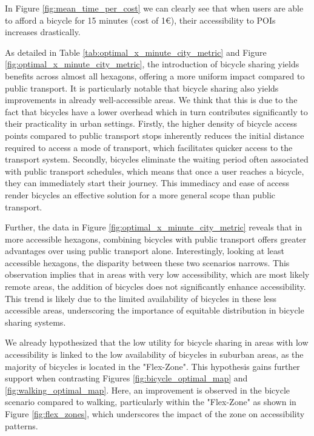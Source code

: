 In Figure \ref{fig:mean_time_per_cost} we can clearly see that when users are able to afford a bicycle for 15 minutes (cost of 1€), their accessibility to POIs increases drastically.


As detailed in Table \ref{tab:optimal_x_minute_city_metric} and Figure \ref{fig:optimal_x_minute_city_metric}, the introduction of bicycle sharing yields benefits across almost all hexagons, offering a more uniform impact compared to public transport. 
It is particularly notable that bicycle sharing also yields improvements in already well-accessible areas. 
We think that this is due to the fact that bicycles have a lower overhead which in turn contributes significantly to their practicality in urban settings.
Firstly, the higher density of bicycle access points compared to public transport stops inherently reduces the initial distance required to access a mode of transport, which  facilitates quicker access to the transport system. 
Secondly, bicycles eliminate the waiting period often associated with public transport schedules, which means that once a user reaches a bicycle, they can immediately start their journey. 
This immediacy and ease of access render bicycles an effective solution for a more general scope than public transport.

Further, the data in Figure \ref{fig:optimal_x_minute_city_metric} reveals that in more accessible hexagons, combining bicycles with public transport offers greater advantages over using public transport alone. 
Interestingly, looking at least accessible hexagons, the disparity between these two scenarios narrows. 
This observation implies that in areas with very low accessibility, which are most likely remote areas, the addition of bicycles does not significantly enhance accessibility.
This trend is likely due to the limited availability of bicycles in these less accessible areas, underscoring the importance of equitable distribution in bicycle sharing systems.

We already hypothesized that the low utility for bicycle sharing in areas with low accessibility is linked to the low availability of bicycles in suburban areas, as the majority of bicycles is located in the "Flex-Zone".
This hypothesis gains further support when contrasting Figures \ref{fig:bicycle_optimal_map} and \ref{fig:walking_optimal_map}. 
Here, an improvement is observed in the bicycle scenario compared to walking, particularly within the "Flex-Zone" as shown in Figure \ref{fig:flex_zones}, which underscores the impact of the zone on accessibility patterns.

